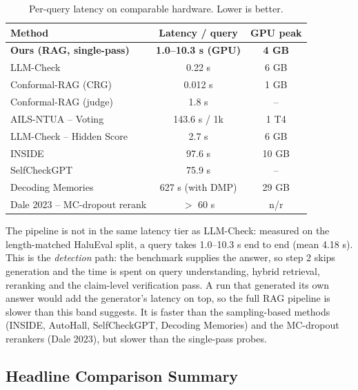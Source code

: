 \begin{table}[ht]
\centering
\small
\begin{tabular}{lcc}
\hline
\textbf{Method} & \textbf{Latency / query} & \textbf{GPU peak} \\
\hline
\textbf{Ours (RAG, single-pass)} & \textbf{1.0--10.3 s (GPU)} & \textbf{4 GB} \\
LLM-Check & 0.22 s & 6 GB \\
Conformal-RAG (CRG) & 0.012 s & 1 GB \\
Conformal-RAG (judge) & 1.8 s & -- \\
AILS-NTUA -- Voting & 143.6 s / 1k & 1 T4 \\
LLM-Check -- Hidden Score & 2.7 s & 6 GB \\
INSIDE & 97.6 s & 10 GB \\
SelfCheckGPT & 75.9 s & -- \\
Decoding Memories & 627 s (with DMP) & 29 GB \\
Dale 2023 -- MC-dropout rerank & $>$ 60 s & n/r \\
\hline
\end{tabular}
\caption{Per-query latency on comparable hardware. Lower is better.}
\label{tab:efficiency}
\end{table}

The pipeline is not in the same latency tier as LLM-Check: measured on the length-matched HaluEval split, a query takes 1.0--10.3 s end to end (mean 4.18 s). This is the \emph{detection} path: the benchmark supplies the answer, so step 2 skips generation and the time is spent on query understanding, hybrid retrieval, reranking and the claim-level verification pass. A run that generated its own answer would add the generator's latency on top, so the full RAG pipeline is slower than this band suggests. It is faster than the sampling-based methods (INSIDE, AutoHall, SelfCheckGPT, Decoding Memories) and the MC-dropout rerankers (Dale 2023), but slower than the single-pass probes.

\subsection{Headline Comparison Summary}
\label{sec:headline}

